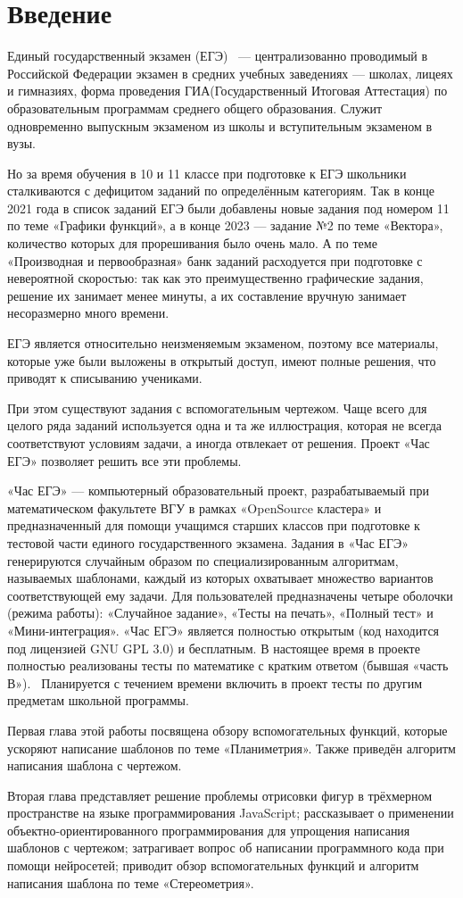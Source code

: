 
\section*{Введение}
Единый государственный экзамен (ЕГЭ)~ — централизованно проводимый в Российской
Федерации экзамен в средних учебных заведениях — школах, лицеях и гимназиях,
форма проведения ГИА(Государственный Итоговая Аттестация) по образовательным программам среднего общего образования.
Служит одновременно выпускным экзаменом из школы и вступительным экзаменом в вузы.

Но за время обучения в 10 и 11 классе при подготовке к ЕГЭ школьники сталкиваются с дефицитом заданий по определённым категориям.
Так в конце 2021 года в список заданий ЕГЭ были добавлены новые задания под номером 11 по теме «Графики функций», а в конце 2023 --- задание №2 по теме «Вектора», количество которых для прорешивания было очень мало. 
А по теме «Производная и первообразная» банк заданий расходуется при подготовке с невероятной скоростью:
так как это преимущественно графические задания, решение их занимает менее минуты, а их составление вручную занимает несоразмерно много времени.

ЕГЭ является относительно неизменяемым экзаменом, поэтому все материалы, которые уже были выложены в открытый доступ, имеют полные решения, что приводят к списыванию учениками.

При этом существуют задания с вспомогательным чертежом. Чаще всего для целого ряда заданий используется одна и та же иллюстрация, которая не всегда соответствуют условиям задачи, а иногда отвлекает от решения.
Проект «Час ЕГЭ» позволяет решить все эти проблемы.

«Час ЕГЭ» --- компьютерный образовательный проект, разрабатываемый при математическом
факультете ВГУ в рамках «OpenSource кластера» и предназначенный для помощи учащимся
старших классов при подготовке к тестовой части единого государственного экзамена.
Задания в «Час ЕГЭ» генерируются случайным образом по специализированным алгоритмам,
называемых шаблонами, каждый из которых
охватывает множество вариантов соответствующей ему задачи. Для
пользователей
предназначены четыре оболочки (режима работы): «Случайное задание», «Тесты на печать»,
«Полный тест» и «Мини-интеграция».
«Час ЕГЭ» является полностью открытым (код находится под лицензией GNU GPL 3.0)
и бесплатным.
В настоящее время в проекте полностью реализованы тесты по математике с кратким
ответом (бывшая «часть В»).~\cite{fipi}
Планируется с течением времени включить в проект тесты по другим предметам школьной
программы.

Первая глава этой работы посвящена обзору вспомогательных функций, которые ускоряют написание шаблонов по теме «Планиметрия». Также приведён алгоритм написания шаблона с чертежом.

Вторая глава представляет решение проблемы отрисовки фигур в трёхмерном пространстве на языке программирования JavaScript; рассказывает о применении объектно-ориентированного программирования для упрощения написания шаблонов с чертежом; затрагивает вопрос об написании программного кода при помощи нейросетей; приводит обзор вспомогательных функций и алгоритм написания шаблона по теме «Стереометрия». 

